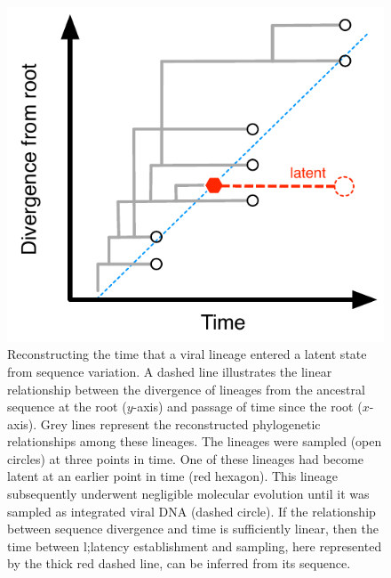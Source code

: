 \documentclass[12pt]{article}
\begin{document}
\begin{figure}[ht]
	\centering
	\includegraphics{figures/latency-scheme}
	\caption[Latency Scheme]{ 
	Reconstructing the time that a viral lineage entered a latent state from sequence variation.  
	A dashed line illustrates the linear relationship between the divergence of lineages from the ancestral sequence at the root ($y$-axis) and passage of time since the root ($x$-axis).
	Grey lines represent the reconstructed phylogenetic relationships among these lineages.
	The lineages were sampled (open circles) at three points in time.
	One of these lineages had become latent at an earlier point in time (red hexagon).
	This lineage subsequently underwent negligible molecular evolution until it was sampled as integrated viral DNA (dashed circle).
	If the relationship between sequence divergence and time is sufficiently linear, then the time between l;latency establishment and sampling, here represented by the thick red dashed line, can be inferred from its sequence.
	}
	\label{fig:latenttree}
\end{figure}
\end{document}
